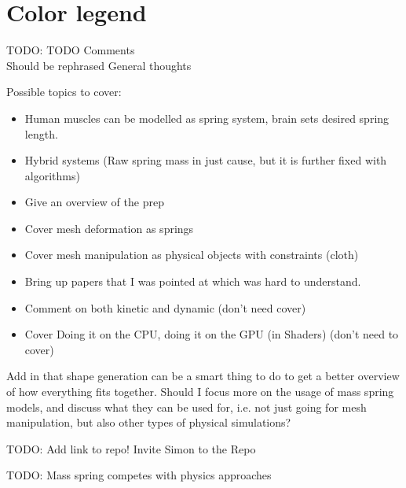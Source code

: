 \documentclass[MACS,english]{ntnuthesis/ntnuthesis}
\newcommand{\todo}[1]{{\color{blue}TODO: #1\\}}
\newcommand{\rephrase}[1]{{\color{Aquamarine} #1}}
\newcommand{\think}[1]{{\color{Orchid} #1 }}
\begin{document}
\makefrontpages %


\tableofcontents

\hypersetup{pageanchor=true}


\section{Color legend}
\todo{TODO Comments}
\rephrase{Should be rephrased}
\think{General thoughts}

\think{
    Possible topics to cover:
    \begin{itemize}
        \item Human muscles can be modelled as spring system, brain sets desired spring length.
        \item Hybrid systems (Raw spring mass in just cause, but it is further fixed with algorithms)
        \item Give an overview of the prep
        \item Cover mesh deformation as springs
        \item Cover mesh manipulation as physical objects with constraints (cloth)
        \item Bring up papers that I was pointed at which was hard to understand.
        \item Comment on both kinetic and dynamic (don't need cover)
        \item Cover Doing it on the CPU, doing it on the GPU (in Shaders) (don't need to cover)
    \end{itemize}
}

\think{Add in that shape generation can be a smart thing to do to get a better overview of how everything fits together.}
\think{Should I focus more on the usage of mass spring models, and discuss what they can be used for, i.e. not just going for mesh manipulation, but also other types of physical simulations?}

\todo{Add link to repo! Invite Simon to the Repo}

\todo{
    Mass spring competes with physics approaches
}


%
%
%




\appendix

%
\end{document}
